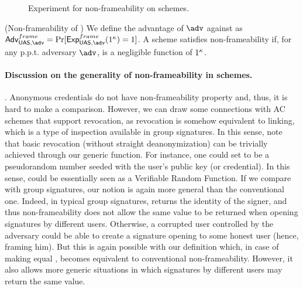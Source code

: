 \begin{figure}[htp!]
  \caption{Experiment for non-frameability on \UAS schemes.}
  \label{fig:exp-uas-frame}
\end{figure}

\begin{definition}{(Non-frameability of \UAS)}
  \label{def:frame-uas}
  We define the advantage \AdvNonframe of $\adv$ against \ExpNonframe as
  $\AdvNonframe=\Pr\lbrack\ExpNonframe(1^\secpar)=1\rbrack$.
  A \GSAC scheme satisfies non-frameability if, for any p.p.t. adversary $\adv$,
  \AdvNonframe is a negligible function of $1^\kappa$.
\end{definition}

\paragraph{Discussion on the generality of non-frameability in \UAS schemes.} %
.
Anonymous credentials do not have non-frameability property and, thus, it is
hard to make a comparison. However, we can draw some connections with AC schemes
that support revocation, as revocation is somehow equivalent to linking, which
is a type of inspection available in group signatures. In this sense, note that
basic revocation (without straight deanonymization) can be trivially achieved
through our generic \Inspect function. For instance, one could set \finsp to
be a pseudorandom number seeded with the user's public key (or credential). In
this sense, \Inspect could be essentially seen as a Verifiable Random Function.
If we compare with group signatures, our notion is again more general than the
conventional one. Indeed, in typical group signatures, \Open returns the
identity of the signer, and thus non-frameability does not allow the same value
to be returned when opening signatures by different users. Otherwise, a
corrupted user controlled by the adversary could be able to create a signature
opening to some honest user (hence, framing him). But this is again possible
with our definition which, in case of making \Inspect equal \Open, becomes
equivalent to conventional non-frameability. However, it also allows more
generic situations in which signatures by different users may return the same
value. 
  
